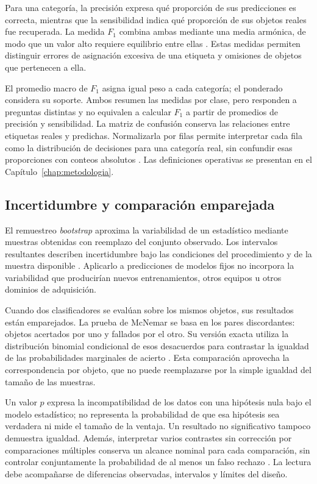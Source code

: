 Para una categoría, la precisión expresa qué proporción de sus predicciones es correcta, mientras que la sensibilidad indica qué proporción de sus objetos reales fue recuperada. La medida $F_1$ combina ambas mediante una media armónica, de modo que un valor alto requiere equilibrio entre ellas \parencite{powers2011}. Estas medidas permiten distinguir errores de asignación excesiva de una etiqueta y omisiones de objetos que pertenecen a ella.

El promedio macro de $F_1$ asigna igual peso a cada categoría; el ponderado considera su soporte. Ambos resumen las medidas por clase, pero responden a preguntas distintas y no equivalen a calcular $F_1$ a partir de promedios de precisión y sensibilidad. La matriz de confusión conserva las relaciones entre etiquetas reales y predichas. Normalizarla por filas permite interpretar cada fila como la distribución de decisiones para una categoría real, sin confundir esas proporciones con conteos absolutos \parencite{powers2011}. Las definiciones operativas se presentan en el Capítulo~\ref{chap:metodologia}.

\subsection{Incertidumbre y comparación emparejada}
El remuestreo \textit{bootstrap} aproxima la variabilidad de un estadístico mediante muestras obtenidas con reemplazo del conjunto observado. Los intervalos resultantes describen incertidumbre bajo las condiciones del procedimiento y de la muestra disponible \parencite{efron1986bootstrap}. Aplicarlo a predicciones de modelos fijos no incorpora la variabilidad que producirían nuevos entrenamientos, otros equipos u otros dominios de adquisición.

Cuando dos clasificadores se evalúan sobre los mismos objetos, sus resultados están emparejados. La prueba de McNemar se basa en los pares discordantes: objetos acertados por uno y fallados por el otro. Su versión exacta utiliza la distribución binomial condicional de esos desacuerdos para contrastar la igualdad de las probabilidades marginales de acierto \parencite{mcnemar1947,fagerland2013}. Esta comparación aprovecha la correspondencia por objeto, que no puede reemplazarse por la simple igualdad del tamaño de las muestras.

Un valor $p$ expresa la incompatibilidad de los datos con una hipótesis nula bajo el modelo estadístico; no representa la probabilidad de que esa hipótesis sea verdadera ni mide el tamaño de la ventaja. Un resultado no significativo tampoco demuestra igualdad. Además, interpretar varios contrastes sin corrección por comparaciones múltiples conserva un alcance nominal para cada comparación, sin controlar conjuntamente la probabilidad de al menos un falso rechazo \parencite{wasserstein2016}. La lectura debe acompañarse de diferencias observadas, intervalos y límites del diseño.

